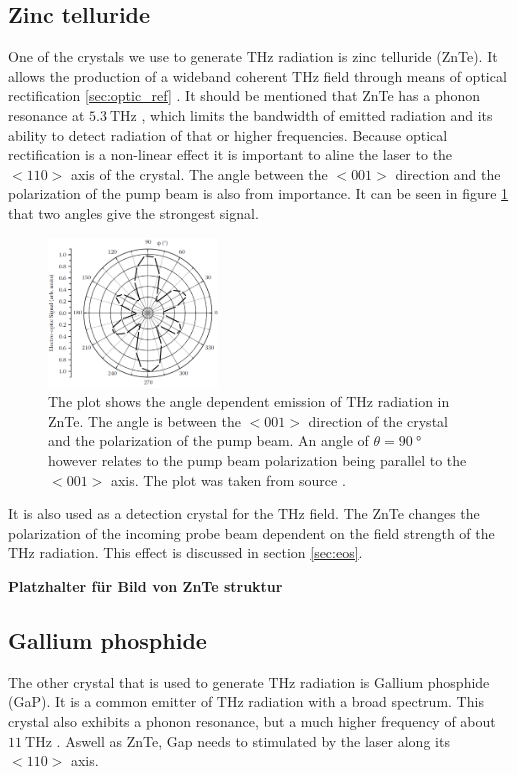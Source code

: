 \subsection{Zinc telluride}
\label{sec:znte}
One of the crystals we use to generate $\si{\tera\hertz}$ radiation is zinc telluride (ZnTe). 
It allows the production of a wideband coherent $\si{\tera\hertz}$ field through means of optical rectification \ref{sec:optic_ref} \cite{ZnTe_Nahata_Weling_1996}.
It should be mentioned that ZnTe has a phonon resonance at $\SI{5.3}{\tera\hertz}$ \cite{phonon_modes}, which limits the bandwidth of emitted radiation and its ability to detect radiation of that or higher frequencies.
Because optical rectification is a non-linear effect it is important to aline the laser to the $<110>$ axis of the crystal.
The angle between the $<001>$ direction and the polarization of the pump beam is also from importance.
It can be seen in figure \ref{fig:polarization_dependence_angle} that two angles give the strongest signal.
\begin{figure}
    \centering
    \includegraphics[width=0.4\textwidth]{refferenced_pic/degreedepenceZnTe.png}
    \caption{The plot shows the angle dependent emission of $\si{\tera\hertz}$ radiation in ZnTe.
    The angle is between the $<001>$ direction of the crystal and the polarization of the pump beam. An angle of $\theta = \SI{90}{\degree}$ however relates to the pump beam polarization being parallel to the $<001>$ axis.
    The plot was taken from source \cite{selig}.}
    \label{fig:polarization_dependence_angle}
\end{figure}
It is also used as a detection crystal for the $\si{\tera\hertz}$ field.
The ZnTe changes the polarization of the incoming probe beam dependent on the field strength of the $\si{\tera\hertz}$ radiation.
This effect is discussed in section \ref{sec:eos}.

\textbf{Platzhalter für Bild von ZnTe struktur}

\subsection{Gallium phosphide}
The other crystal that is used to generate $\si{\tera\hertz}$ radiation is Gallium phosphide (GaP).
It is a common emitter of $\si{\tera\hertz}$ radiation with a broad spectrum.
This crystal also exhibits a phonon resonance, but a much higher frequency of about $\SI{11}{\tera\hertz}$ \cite[60]{wiki_book}.
Aswell as ZnTe, Gap needs to stimulated by the laser along its $<110>$ axis.

